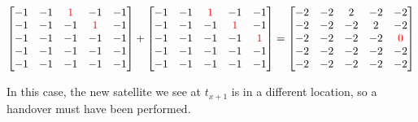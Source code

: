 \documentclass[IN,11pt,twoside,openright,idp,english]{tumthesis}
\begin{document}
$\begin{bmatrix}
-1 & -1 & \color{red}1 &           -1 & -1 \\
-1 & -1 &           -1 & \color{red}1 & -1 \\
-1 & -1 &           -1 &           -1 & -1 \\
-1 & -1 &           -1 &           -1 & -1 \\
-1 & -1 &           -1 &           -1 & -1 \\ 
\end{bmatrix}
+
\begin{bmatrix}
-1 & -1 & \color{red}1 &           -1 &           -1 \\
-1 & -1 &           -1 & \color{red}1 &           -1 \\
-1 & -1 &           -1 &           -1 & \color{red}1 \\
-1 & -1 &           -1 &           -1 &           -1 \\
-1 & -1 &           -1 &           -1 &           -1 \\
\end{bmatrix}
=
\begin{bmatrix}
-2 & -2 & 2 &  -2 &           -2 \\
-2 & -2 & -2 &  2 &           -2 \\
-2 & -2 & -2 & -2 & \color{red}0 \\
-2 & -2 & -2 & -2 &            -2 \\
-2 & -2 & -2 & -2 &            -2 \\
\end{bmatrix}$ \vspace{10mm}

In this case, the new satellite we see at $ t_{x+1} $ is in a different location, so a handover must have been performed. \vspace{10mm}
\end{document}
